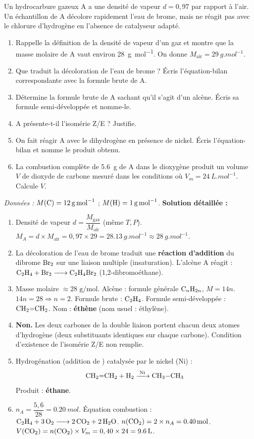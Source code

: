 \documentclass[11pt]{article}
\begin{document}
\begin{exoresolu}
Un hydrocarbure gazeux A a une densité de vapeur $d = 0{,}97$ par rapport à l'air. Un échantillon de A décolore rapidement l'eau de brome, mais ne réagit pas avec le chlorure d'hydrogène en l'absence de catalyseur adapté.
\begin{enumerate}
\item Rappelle la définition de la densité de vapeur d'un gaz et montre que la masse molaire de A vaut environ \SI{28}{g.mol^{-1}}. On donne $M_{\text{air}} = \SI{29}{g.mol^{-1}}$.
\item Que traduit la décoloration de l'eau de brome ? Écris l'équation-bilan correspondante avec la formule brute de A.
\item Détermine la formule brute de A sachant qu'il s'agit d'un alcène. Écris sa formule semi-développée et nomme-le.
\item A présente-t-il l'isomérie Z/E ? Justifie.
\item On fait réagir A avec le dihydrogène en présence de nickel. Écris l'équation-bilan et nomme le produit obtenu.
\item La combustion complète de \SI{5,6}{g} de A dans le dioxygène produit un volume $V$ de dioxyde de carbone mesuré dans les conditions où $V_m = \SI{24}{L.mol^{-1}}$. Calcule $V$.
\end{enumerate}
\emph{Données :} $M(\ce{C}) = \SI{12}{g.mol^{-1}}$ ; $M(\ce{H}) = \SI{1}{g.mol^{-1}}$.
\tcblower
\textbf{Solution détaillée :}
\begin{enumerate}
\item Densité de vapeur $d = \dfrac{M_{\text{gaz}}}{M_{\text{air}}}$ (même $T, P$).
  $M_A = d \times M_{\text{air}} = 0,97 \times 29 = \SI{28,13}{g.mol^{-1}} \approx \SI{28}{g.mol^{-1}}$.
\item La décoloration de l'eau de brome traduit une \textbf{réaction d'addition} du dibrome $\ce{Br2}$ sur une liaison multiple (insaturation). L'alcène A réagit : $\ce{C2H4 + Br2 -> C2H4Br2}$ (1,2-dibromoéthane).
\item Masse molaire $\approx 28 \text{ g/mol}$. Alcène : formule générale $\ce{C_nH_{2n}}$, $M = 14n$.
  $14n = 28 \Rightarrow n=2$. Formule brute : \textbf{$\ce{C2H4}$}.
  Formule semi-développée : \textbf{$\ce{CH2=CH2}$}. Nom : \textbf{éthène} (nom usuel : éthylène).
\item \textbf{Non.} Les deux carbones de la double liaison portent chacun deux atomes d'hydrogène (deux substituants identiques sur chaque carbone). Condition d'existence de l'isomérie Z/E non remplie.
\item Hydrogénation (addition de ) catalysée par le nickel (Ni) :
  \[ \ce{CH2=CH2 + H2 ->[Ni] CH3-CH3} \]
  Produit : \textbf{éthane}.
\item $n_A = \dfrac{5,6}{28} = \SI{0,20}{mol}$.
  Équation combustion : $\ce{C2H4 + 3 O2 -> 2 CO2 + 2 H2O}$.
  $n(\ce{CO2}) = 2 \times n_A = \SI{0,40}{mol}$.
  $V(\ce{CO2}) = n(\ce{CO2}) \times V_m = 0,40 \times 24 = \textbf{\SI{9,6}{L}}$.
\end{enumerate}
\end{exoresolu}
\end{document}
